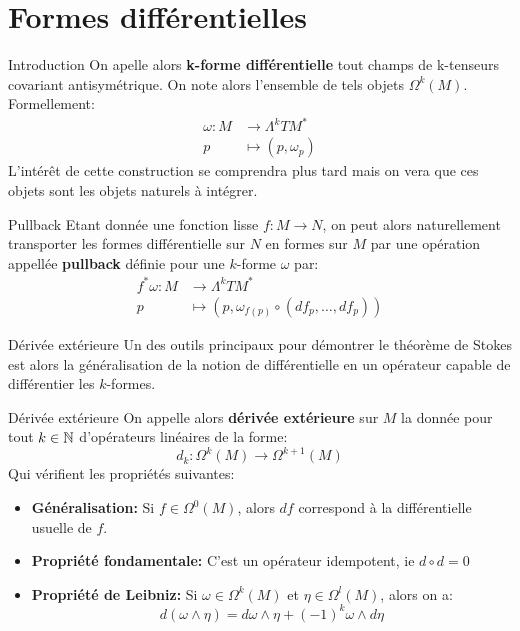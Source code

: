\documentclass{beamer}
\begin{document}
    \section{Formes différentielles}
        \begin{frame}{Introduction}
            On apelle alors \textbf{k-forme différentielle} tout champs de k-tenseurs covariant antisymétrique. On note alors l'ensemble de tels objets $\Omega^k(M)$. Formellement:
            \[ 
                \begin{aligned}
                   \omega : M &\longrightarrow \Lambda^kTM^* \\
                   p &\longmapsto (p, \omega_p)
                \end{aligned} 
             \]
            L'intérêt de cette construction se comprendra plus tard mais on vera que ces objets sont les objets naturels à intégrer.
        \end{frame}
        \begin{frame}{Pullback}
            Etant donnée une fonction lisse $f : M \longrightarrow N$, on peut alors naturellement transporter les formes différentielle sur $N$ en formes sur $M$ par une opération appellée \textbf{pullback} définie pour une \( k \)-forme \( \omega \) par:
            \begin{align*}
                f^*\omega : M  &\longrightarrow \Lambda^kTM^* \\
                p &\longmapsto (p, \omega_{f(p)} \circ (df_p, \ldots, df_p))
            \end{align*}
        \end{frame}
        \begin{frame}{Dérivée extérieure}
            Un des outils principaux pour démontrer le théorème de Stokes est alors la généralisation de la notion de différentielle en un opérateur capable de différentier les \( k \)-formes.
        \end{frame}        
        \begin{frame}{Dérivée extérieure}
            On appelle alors \textbf{dérivée extérieure} sur \( M \) la donnée pour tout \( k \in \mathbb{N} \) d'opérateurs linéaires de la forme:
            \[ 
               d_k : \Omega^k(M) \longrightarrow \Omega^{k+1}(M) 
            \]
            Qui vérifient les propriétés suivantes:
            \begin{itemize}
                \item \textbf{Généralisation:} Si \( f \in \Omega^0(M)\), alors \( df \) correspond à la différentielle usuelle de \( f \).
                \item \textbf{Propriété fondamentale:} C'est un opérateur idempotent, ie \(d \circ d = 0\)
                \item \textbf{Propriété de Leibniz:} Si \( \omega \in \Omega^k(M) \) et \( \eta \in \Omega^l(M) \), alors on a:
                \[ 
                   d(\omega \wedge \eta) = d\omega \wedge \eta + (-1)^k\omega \wedge d\eta 
                \]
            \end{itemize}
        \end{frame}
\end{document}
